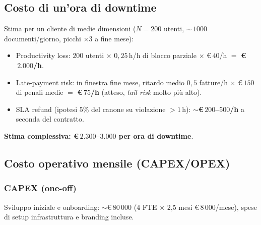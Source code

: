 \documentclass[11pt,a4paper,oneside]{article}
\begin{document}
\subsection{Costo di un'ora di downtime}
Stima per un cliente di medie dimensioni ($N=200$ utenti, $\sim$\,$1000$
documenti/giorno, picchi $\times3$ a fine mese):
\begin{itemize}[leftmargin=*]
    \item Productivity loss: $200$ utenti $\times$ $0{,}25$\,h/h di blocco
          parziale $\times$ \euro$\,40$/h $=$ \textbf{\euro$\,2.000$/h}.
    \item Late-payment risk: in finestra fine mese, ritardo medio $0{,}5$
          fatture/h $\times$ \euro$\,150$ di penali medie $=$
          \textbf{\euro$\,75$/h} (atteso, \emph{tail risk} molto pi\`u alto).
    \item SLA refund (ipotesi $5\%$ del canone su violazione $> 1$\,h):
          \textbf{$\sim$\euro$\,200$--$500$/h} a seconda del contratto.
\end{itemize}
\textbf{Stima complessiva: \euro$\,2.300$--$3.000$ per ora di downtime}.

\subsection{Costo operativo mensile (CAPEX/OPEX)}
\subsubsection{CAPEX (one-off)}
Sviluppo iniziale e onboarding: $\sim$\euro$\,80\,000$ (4 FTE $\times$ 2,5 mesi
\@ \euro$\,8\,000$/mese), spese di setup infrastruttura e branding incluse.
\end{document}
